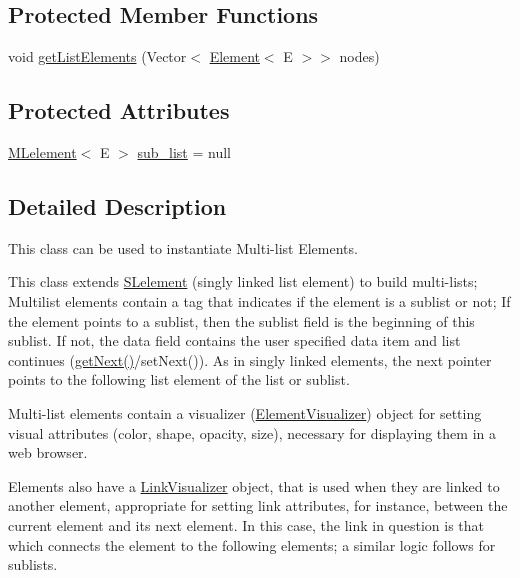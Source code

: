 \subsection*{Protected Member Functions}
\begin{DoxyCompactItemize}
\item 
void \hyperlink{classbridges_1_1base_1_1_m_lelement_a496378739f031ef451a6ab1f63c5770f}{get\+List\+Elements} (Vector$<$ \hyperlink{classbridges_1_1base_1_1_element}{Element}$<$ E $>$$>$ nodes)
\end{DoxyCompactItemize}
\subsection*{Protected Attributes}
\begin{DoxyCompactItemize}
\item 
\hyperlink{classbridges_1_1base_1_1_m_lelement}{M\+Lelement}$<$ E $>$ \hyperlink{classbridges_1_1base_1_1_m_lelement_a7dee2985f9a8134d3076eb9478422403}{sub\+\_\+list} = null
\end{DoxyCompactItemize}


\subsection{Detailed Description}
This class can be used to instantiate Multi-\/list Elements. 

This class extends \hyperlink{classbridges_1_1base_1_1_s_lelement}{S\+Lelement} (singly linked list element) to build multi-\/lists; Multilist elements contain a tag that indicates if the element is a sublist or not; If the element points to a sublist, then the sublist field is the beginning of this sublist. If not, the data field contains the user specified data item and list continues (\hyperlink{classbridges_1_1base_1_1_m_lelement_a52ddc26a69eccda5f5b57b94cf87a545}{get\+Next()}/set\+Next()). As in singly linked elements, the next pointer points to the following list element of the list or sublist.

Multi-\/list elements contain a visualizer (\hyperlink{classbridges_1_1base_1_1_element_visualizer}{Element\+Visualizer}) object for setting visual attributes (color, shape, opacity, size), necessary for displaying them in a web browser.

Elements also have a \hyperlink{classbridges_1_1base_1_1_link_visualizer}{Link\+Visualizer} object, that is used when they are linked to another element, appropriate for setting link attributes, for instance, between the current element and its next element. In this case, the link in question is that which connects the element to the following elements; a similar logic follows for sublists.

